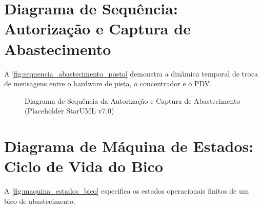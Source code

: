 \section{Diagrama de Sequência: Autorização e Captura de Abastecimento}

A \autoref{fig:sequencia_abastecimento_posto} demonstra a dinâmica temporal de troca de mensagens entre o hardware de pista, o concentrador e o PDV.

\begin{figure}[htbp]
    \centering
    \caption{Diagrama de Sequência da Autorização e Captura de Abastecimento (Placeholder StarUML v7.0)}
    \label{fig:sequencia_abastecimento_posto}
\end{figure}

\section{Diagrama de Máquina de Estados: Ciclo de Vida do Bico}

A \autoref{fig:maquina_estados_bico} especifica os estados operacionais finitos de um bico de abastecimento.

